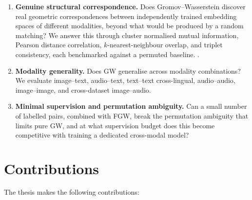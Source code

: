 \begin{enumerate}
  \item \textbf{Genuine structural correspondence.} Does Gromov--Wasserstein discover real geometric correspondences between independently trained embedding spaces of different modalities, beyond what would be produced by a random matching? We answer this through cluster normalised mutual information, Pearson distance correlation, $k$-nearest-neighbour overlap, and triplet consistency, each benchmarked against a permuted baseline.
  \cite{huh2024platonic,groger2026aristotelian}.
  \item \textbf{Modality generality.} Does GW generalise across modality combinations? We evaluate image--text, audio--text, text--text cross-lingual, audio--audio, image--image, and cross-dataset image--audio.
  \item \textbf{Minimal supervision and permutation ambiguity.} Can a small number of labelled pairs, combined with FGW, break the permutation ambiguity that limits pure GW, and at what supervision budget does this become competitive with training a dedicated cross-modal model?
\end{enumerate}

\section{Contributions}

The thesis makes the following contributions:

